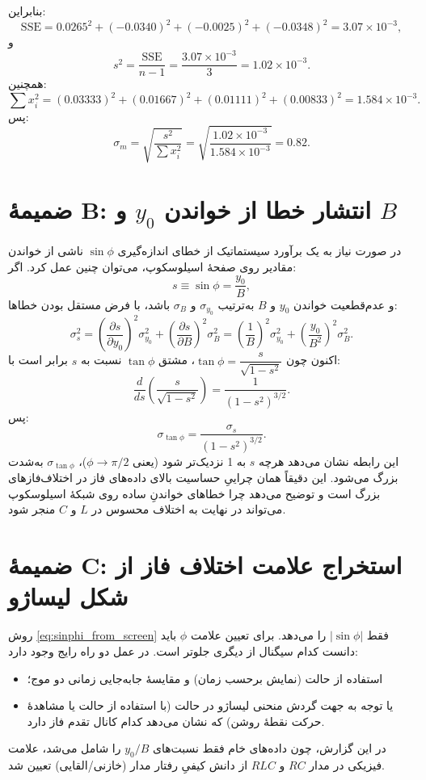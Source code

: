 \documentclass[a4paper, 11pt]{article}
\begin{document}
بنابراین:
\[
\mathrm{SSE}=0.0265^2+(-0.0340)^2+(-0.0025)^2+(-0.0348)^2
=3.07\times 10^{-3},
\]
و
\[
s^2=\frac{\mathrm{SSE}}{n-1}=\frac{3.07\times10^{-3}}{3}=1.02\times10^{-3}.
\]
همچنین:
\[
\sum x_i^2=(0.03333)^2+(0.01667)^2+(0.01111)^2+(0.00833)^2
=1.584\times 10^{-3}.
\]
پس:
\[
\sigma_m=\sqrt{\frac{s^2}{\sum x_i^2}}
=\sqrt{\frac{1.02\times10^{-3}}{1.584\times10^{-3}}}=0.82.
\]

\section{ضمیمهٔ B: انتشار خطا از خواندن \(y_0\) و \(B\)}

در صورت نیاز به یک برآورد سیستماتیک از خطای اندازه‌گیری \(\sin\phi\) ناشی از خواندن مقادیر روی صفحهٔ اسیلوسکوپ، می‌توان چنین عمل کرد. اگر:
\[
s\equiv \sin\phi=\frac{y_0}{B},
\]
و عدم‌قطعیت خواندن \(y_0\) و \(B\) به‌ترتیب \(\sigma_{y_0}\) و \(\sigma_B\) باشد، با فرض مستقل بودن خطاها:
\[
\sigma_s^2=\left(\frac{\partial s}{\partial y_0}\right)^2\sigma_{y_0}^2+\left(\frac{\partial s}{\partial B}\right)^2\sigma_B^2
=
\left(\frac{1}{B}\right)^2\sigma_{y_0}^2+\left(\frac{y_0}{B^2}\right)^2\sigma_B^2.
\]
اکنون چون \(\tan\phi=\dfrac{s}{\sqrt{1-s^2}}\)، مشتق \(\tan\phi\) نسبت به \(s\) برابر است با:
\[
\frac{d}{ds}\left(\frac{s}{\sqrt{1-s^2}}\right)=\frac{1}{(1-s^2)^{3/2}}.
\]
پس:
\[
\sigma_{\tan\phi}=\frac{\sigma_s}{(1-s^2)^{3/2}}.
\]
این رابطه نشان می‌دهد هرچه \(s\) به 1 نزدیک‌تر شود (یعنی \(\phi\to \pi/2\))، \(\sigma_{\tan\phi}\) به‌شدت بزرگ می‌شود. این دقیقاً همان چراییِ حساسیت بالای داده‌های فاز در اختلاف‌فازهای بزرگ است و توضیح می‌دهد چرا خطاهای خواندنِ ساده روی شبکهٔ اسیلوسکوپ می‌تواند در نهایت به اختلاف محسوس در \(L\) و \(C\) منجر شود.

\section{ضمیمهٔ C: استخراج علامت اختلاف فاز از شکل لیساژو}

روش \eqref{eq:sinphi_from_screen} فقط \(|\sin\phi|\) را می‌دهد. برای تعیین علامت \(\phi\) باید دانست کدام سیگنال از دیگری جلوتر است. در عمل دو راه رایج وجود دارد:
\begin{itemize}
    \item استفاده از حالت  (نمایش برحسب زمان) و مقایسهٔ جابه‌جایی زمانی دو موج؛
    \item یا توجه به جهت گردش منحنی لیساژو در حالت  (با استفاده از حالت  یا مشاهدهٔ حرکت نقطهٔ روشن) که نشان می‌دهد کدام کانال تقدم فاز دارد.
\end{itemize}
در این گزارش، چون داده‌های خام فقط نسبت‌های \(y_0/B\) را شامل می‌شد، علامت فیزیکی در مدار $RC$ و $RLC$ از دانش کیفیِ رفتار مدار (خازنی/القایی) تعیین شد.
\end{document}
